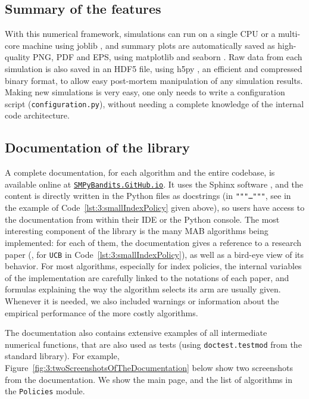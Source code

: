 \subsection{Summary of the features}

With this numerical framework, simulations can run on a single CPU or a multi-core machine using joblib \cite{joblib},
and summary plots are automatically saved as high-quality PNG, PDF and EPS, using matplotlib \cite{matplotlib} and seaborn \cite{seaborn}.
Raw data from each simulation is also saved in an HDF5 file, using h5py \cite{h5py}, an efficient and compressed binary format, to allow easy post-mortem manipulation of any simulation results.
Making new simulations is very easy, one only needs to write a configuration script (\texttt{configuration.py}), without needing a complete knowledge of the internal code architecture.


\subsection{Documentation of the library}

A complete documentation, for each algorithm and the entire codebase, is available online at
\texttt{\href{https://SMPyBandits.GitHub.io}{SMPyBandits.GitHub.io}}.
It uses the Sphinx software \cite{sphinx}, and the content is directly written in the Python files as docstrings (in \texttt{"""\dots"""}, see in the example of Code~\ref{lst:3:smallIndexPolicy} given above), so users have access to the documentation from within their IDE or the Python console.
The most interesting component of the library is the many MAB algorithms being implemented: for each of them, the documentation gives a reference to a research paper (\eg, \cite{Auer02} for \texttt{UCB} in Code~\ref{lst:3:smallIndexPolicy}), as well as a bird-eye view of its behavior.
For most algorithms, especially for index policies, the internal variables of the implementation are carefully linked to the notations of each paper, and formulas explaining the way the algorithm selects its arm are usually given.
Whenever it is needed, we also included warnings or information about the empirical performance of the more costly algorithms.

The documentation also contains extensive examples of all intermediate numerical functions, that are also used as tests (using \texttt{doctest.testmod} from the standard library).
For example, Figure~\ref{fig:3:twoScreenshotsOfTheDocumentation} below show two screenshots from the documentation.
We show the main page, and the list of algorithms in the \texttt{Policies} module.


